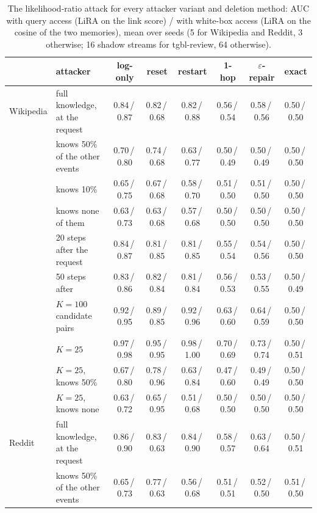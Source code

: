 \begin{table}[!htb]
\centering\scriptsize
\caption{The likelihood-ratio attack for every attacker variant and deletion method: AUC with query access (LiRA on the link
score) / with white-box access (LiRA on the cosine of the two memories), mean over seeds (5 for Wikipedia and Reddit, 3
otherwise; 16 shadow streams for tgbl-review, 64 otherwise).}
\label{tab:liraknow}
\setlength{\tabcolsep}{3pt}
\begin{tabular}{@{}llcccccc@{}}
\toprule
 & attacker & log-only & reset & restart & 1-hop & $\varepsilon$-repair & exact \\
\midrule
Wikipedia & full knowledge, at the request & 0.84\,/\,0.87 & 0.82\,/\,0.68 & 0.82\,/\,0.88 & 0.56\,/\,0.54 & 0.58\,/\,0.56 & 0.50\,/\,0.50 \\
 & knows 50\% of the other events & 0.70\,/\,0.80 & 0.74\,/\,0.68 & 0.63\,/\,0.77 & 0.50\,/\,0.49 & 0.50\,/\,0.49 & 0.50\,/\,0.50 \\
 & knows 10\% & 0.65\,/\,0.75 & 0.67\,/\,0.68 & 0.58\,/\,0.70 & 0.51\,/\,0.50 & 0.51\,/\,0.50 & 0.50\,/\,0.50 \\
 & knows none of them & 0.63\,/\,0.73 & 0.63\,/\,0.68 & 0.57\,/\,0.68 & 0.50\,/\,0.50 & 0.50\,/\,0.50 & 0.50\,/\,0.50 \\
 & 20 steps after the request & 0.84\,/\,0.87 & 0.81\,/\,0.85 & 0.81\,/\,0.85 & 0.55\,/\,0.54 & 0.54\,/\,0.56 & 0.50\,/\,0.50 \\
 & 50 steps after & 0.83\,/\,0.86 & 0.82\,/\,0.84 & 0.81\,/\,0.84 & 0.56\,/\,0.53 & 0.53\,/\,0.55 & 0.50\,/\,0.49 \\
 & $K=100$ candidate pairs & 0.92\,/\,0.95 & 0.89\,/\,0.85 & 0.92\,/\,0.96 & 0.63\,/\,0.60 & 0.64\,/\,0.59 & 0.50\,/\,0.50 \\
 & $K=25$ & 0.97\,/\,0.98 & 0.95\,/\,0.95 & 0.98\,/\,1.00 & 0.70\,/\,0.69 & 0.73\,/\,0.74 & 0.50\,/\,0.51 \\
 & $K=25$, knows 50\% & 0.67\,/\,0.80 & 0.78\,/\,0.96 & 0.63\,/\,0.84 & 0.47\,/\,0.60 & 0.49\,/\,0.49 & 0.50\,/\,0.50 \\
 & $K=25$, knows none & 0.63\,/\,0.72 & 0.65\,/\,0.95 & 0.51\,/\,0.68 & 0.50\,/\,0.50 & 0.50\,/\,0.50 & 0.50\,/\,0.50 \\
\midrule
Reddit & full knowledge, at the request & 0.86\,/\,0.90 & 0.83\,/\,0.63 & 0.84\,/\,0.90 & 0.58\,/\,0.57 & 0.63\,/\,0.64 & 0.50\,/\,0.51 \\
 & knows 50\% of the other events & 0.65\,/\,0.73 & 0.77\,/\,0.63 & 0.56\,/\,0.68 & 0.51\,/\,0.51 & 0.52\,/\,0.50 & 0.51\,/\,0.50 \\

\end{tabular}
\end{table}
